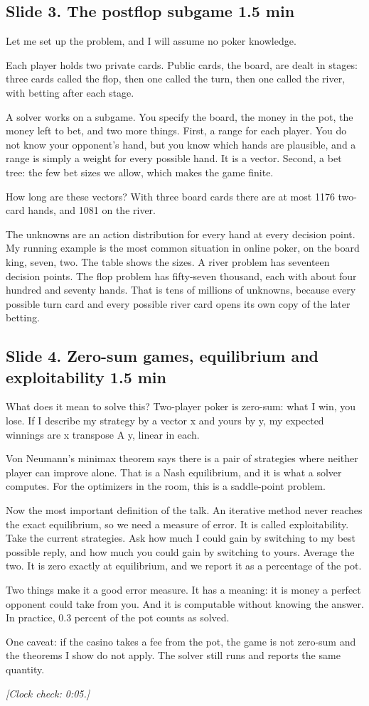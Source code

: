 \documentclass[11pt]{article}
\newcommand{\slidehead}[3]{\subsection*{Slide #1. #2 \hfill {\normalfont\small #3}}}
\newcommand{\cue}[1]{{\small\itshape\color{black!65}[#1]}}
\begin{document}
\slidehead{3}{The postflop subgame}{1.5 min}
\begin{say}
Let me set up the problem, and I will assume no poker knowledge.

Each player holds two private cards. Public cards, the board, are dealt in stages: three cards called the flop,
then one called the turn, then one called the river, with betting after each stage.

A solver works on a subgame. You specify the board, the money in the pot, the money left to bet, and two more
things. First, a range for each player. You do not know your opponent's hand, but you know which hands are
plausible, and a range is simply a weight for every possible hand. It is a vector. Second, a bet tree: the few bet
sizes we allow, which makes the game finite.

How long are these vectors? With three board cards there are at most 1176 two-card hands, and 1081 on the river.

The unknowns are an action distribution for every hand at every decision point. My running example is the most
common situation in online poker, on the board king, seven, two. The table shows the sizes. A river problem has
seventeen decision points. The flop problem has fifty-seven thousand, each with about four hundred and seventy
hands. That is tens of millions of unknowns, because every possible turn card and every possible river card opens
its own copy of the later betting.
\end{say}

\slidehead{4}{Zero-sum games, equilibrium and exploitability}{1.5 min}
\begin{say}
What does it mean to solve this? Two-player poker is zero-sum: what I win, you lose. If I describe my strategy by a
vector x and yours by y, my expected winnings are x transpose A y, linear in each.

Von Neumann's minimax theorem says there is a pair of strategies where neither player can improve alone. That is a
Nash equilibrium, and it is what a solver computes. For the optimizers in the room, this is a saddle-point problem.

Now the most important definition of the talk. An iterative method never reaches the exact equilibrium, so we need
a measure of error. It is called exploitability. Take the current strategies. Ask how much I could gain by
switching to my best possible reply, and how much you could gain by switching to yours. Average the two. It is
zero exactly at equilibrium, and we report it as a percentage of the pot.

Two things make it a good error measure. It has a meaning: it is money a perfect opponent could take from you. And
it is computable without knowing the answer. In practice, 0.3 percent of the pot counts as solved.

One caveat: if the casino takes a fee from the pot, the game is not zero-sum and the theorems I show do not apply.
The solver still runs and reports the same quantity.
\end{say}
\cue{Clock check: 0:05.}
\end{document}
